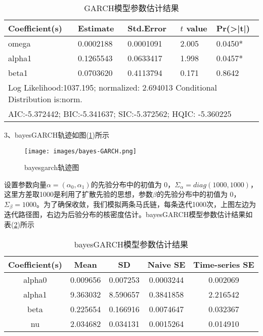         \begin{table}[H]
        \centering
        \caption{GARCH模型参数估计结果}
        \label{GARCH模型参数估计结果}
        \begin{tabular}{lllll}
            \toprule
            Coefficient(s)&  Estimate  &  Std.Error & $t$ value & Pr(>|t|)\\
        \midrule
        omega  & 0.0002188  & 0.0001091 &  2.005 &  0.0450*\\
        alpha1 & 0.1265543  & 0.0633417 &  1.998 &  0.0457*\\
        beta1  & 0.0703620  & 0.4113794 &  0.171 &  0.8642 \\
        \bottomrule
        \multicolumn{5}{l}{\footnotesize Log Likelihood:1037.195; normalized: 2.694013 Conditional Distribution is:norm.}\\
        \multicolumn{5}{l}{\footnotesize AIC:-5.372442; BIC:-5.341637; SIC:-5.372562; HQIC: -5.360225}\\
        \end{tabular}
        \end{table}
    \par
     3、bayesGARCH轨迹如图(\ref{bayesgarch轨迹图})所示
     \begin{figure}[H]
     \centering
     \texttt{[image: images/bayes-GARCH.png]}
     \caption{bayesgarch轨迹图}
     \label{bayesgarch轨迹图}
     \end{figure}
    \par
    设置参数向量$\alpha=(\alpha_0,\alpha_1 )$的先验分布中的初值为 0，$\Sigma_\alpha=diag(1000,1000)$，这里方差取1000是利用了扩散先验的思想，参数$\beta$的先验分布中的初值为 0，$\Sigma_\beta=1000$。为了确保收敛，我们模拟两条马氏链，每条迭代1000次，上图左边为迭代路径图，右边为后验分布的核密度估计。bayesGARCH模型参数估计结果如表(\ref{bayesGARCH模型参数估计结果})所示
        \begin{table}[H]
        \centering
        \caption{bayesGARCH模型参数估计结果}
        \label{bayesGARCH模型参数估计结果}
        \begin{tabular}{ccccc}
            \toprule
           Coefficient(s) & Mean  &  SD & Naive SE  &  Time-series SE\\
        \midrule
        alpha0 & 0.009656 &   0.007253  &  0.0003244  & 0.002069\\
        alpha1 & 9.363032 &   8.590657  &  0.3841858  & 2.216542\\
        beta  &  0.225654&    0.166916 &   0.0074647 &  0.032367\\
        nu & 2.034682 &   0.034131  &  0.0015264  & 0.014910\\
        \bottomrule
        \end{tabular}
        \end{table}

